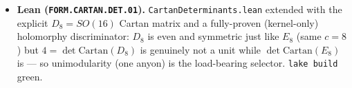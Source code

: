 \begin{itemize}
central ($0.02195$) but $+1.7\sigma$ vs the with-SK best fit ($0.02215\pm0.00057$), a ${\sim}0.3\sigma$ systematic
spread; \mE\ $0.023108$ lies inside the with-SK $3\sigma$ band (upper $0.02388$), an upper-edge pressure point not
a falsification; \mX\ JUNO's sub-1\% precision turns it into a ${\sim}6\sigma$ kill-or-confirm.
\item \textbf{Lean (\texttt{FORM.CARTAN.DET.01}).} \texttt{CartanDeterminants.lean} extended with the explicit
$D_8=SO(16)$ Cartan matrix and a fully-proven (kernel-only) holomorphy discriminator: $D_8$ is even and symmetric
just like $E_8$ (same $c{=}8$) but $4=\det\mathrm{Cartan}(D_8)$ is genuinely not a unit while $\det\mathrm{Cartan}
(E_8)$ is --- so unimodularity (one anyon) is the load-bearing selector. \texttt{lake build} green.
\end{itemize}


